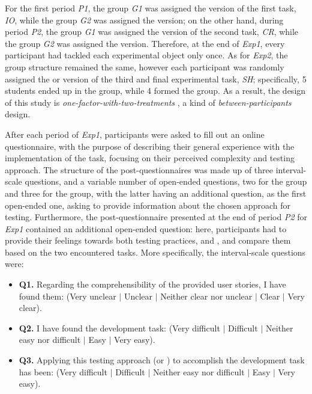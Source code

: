 For the first period \textit{P1}, the group \textit{G1} was assigned the \tdd version of the first task, \textit{IO}, while the group \textit{G2} was assigned the \notdd version; on the other hand, during period \textit{P2}, the group \textit{G1} was assigned the \notdd version of the second task, \textit{CR}, while the group \textit{G2} was assigned the \tdd version.
Therefore, at the end of \textit{Exp1}, every participant had tackled each experimental object only once.
As for \textit{Exp2}, the group structure remained the same, however each participant was randomly assigned the \tdd or \notdd version of the third and final experimental task, \textit{SH}; specifically, 5 students ended up in the \tdd group, while 4 formed the \notdd group. As a result, the design of this study is \textit{one-factor-with-two-treatments} \cite{DBLP:books/sp/WohlinRHOR00}, a kind of \textit{between-participants} design.

After each period of \textit{Exp1}, participants were asked to fill out an online questionnaire, with the purpose of describing their general experience with the implementation of the task, focusing on their perceived complexity and testing approach. 
The structure of the post-questionnaires was made up of three interval-scale questions, and a variable number of open-ended questions, two for the \tdd group and three for the \notdd group, with the latter having an additional question, as the first open-ended one, asking to provide information about the chosen approach for testing. Furthermore, the post-questionnaire presented at the end of period \textit{P2} for \textit{Exp1} contained an additional open-ended question: here, participants had to provide their feelings towards both testing practices, \tdd and \notdd, and compare them based on the two encountered tasks. More specifically, the interval-scale questions were:

\begin{itemize}
    \item \textbf{Q1.} Regarding the comprehensibility of the provided user stories, I have found them: (Very unclear $|$ Unclear $|$ Neither clear nor unclear $|$ Clear $|$ Very clear).
    \item \textbf{Q2.} I have found the development task: (Very difficult $|$ Difficult $|$ Neither easy nor difficult $|$ Easy $|$ Very easy).
    \item \textbf{Q3.} Applying this testing approach (\ie \tdd or \notdd) to accomplish the development task has been: (Very difficult $|$ Difficult $|$ Neither easy nor difficult $|$ Easy $|$ Very easy).
\end{itemize}

